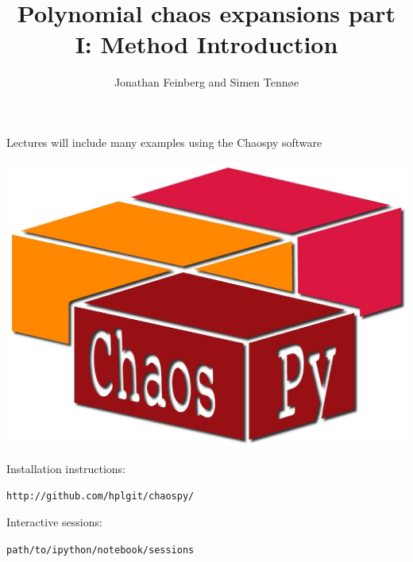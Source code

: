 \documentclass{beamer}
\title{Polynomial chaos expansions part I: Method Introduction}
\author{Jonathan Feinberg and Simen Tennøe}
\begin{document}
\begin{frame}
  \maketitle
\end{frame}

\begin{frame}[fragile]{Lectures will include many examples using the
    Chaospy software}
  \begin{center}
     \includegraphics[width=.5\textwidth]{chaospy_logo.jpg}
  \end{center}
  \begin{alert}{Installation instructions:}

\verb;http://github.com/hplgit/chaospy/;
  \end{alert}

    \begin{alert}{Interactive sessions:}

\verb;path/to/ipython/notebook/sessions;
  \end{alert}
\end{frame}
\end{document}
